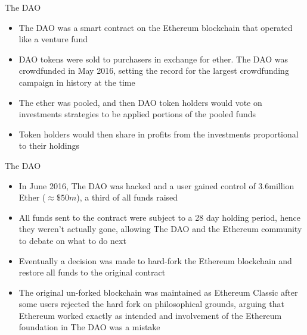 \documentclass[10pt]{beamer}
\begin{document}

\begin{frame}{The DAO}
	\begin{itemize}
		\item The DAO was a smart contract on the Ethereum blockchain that operated like a venture fund
		\item DAO tokens were sold to purchasers in exchange for ether. The DAO was crowdfunded in May 2016, setting the record for the largest crowdfunding campaign in history at the time
		\item The ether was pooled, and then DAO token holders would vote on investments strategies to be applied portions of the pooled funds
		\item Token holders would then share in profits from the investments proportional to their holdings
	\end{itemize}
\end{frame}


\begin{frame}{The DAO}
	\begin{itemize}
		\item In June 2016, The DAO was hacked and a user gained control of 3.6million Ether ($\approx\$50m$), a third of all funds raised
		\item All funds sent to the contract were subject to a 28 day holding period, hence they weren't actually gone, allowing The DAO and the Ethereum community to debate on what to do next
		\item Eventually a decision was made to hard-fork the Ethereum blockchain and restore all funds to the original contract
		\item The original un-forked blockchain was maintained as Ethereum Classic after some users rejected the hard fork on philosophical grounds, arguing that Ethereum worked exactly as intended and  involvement of the Ethereum foundation in The DAO was a mistake
	\end{itemize}
\end{frame}

\end{document}
